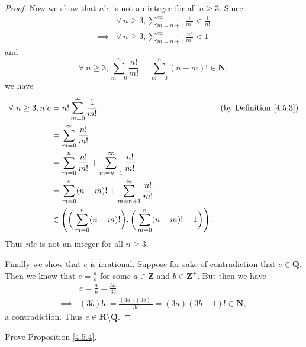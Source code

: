 \begin{proof}
    Now we show that \(n! e\) is not an integer for all \(n \geq 3\).
    Since
    \begin{align*}
                 & \forall\ n \geq 3, \sum_{m = n + 1}^\infty \frac{1}{m!} < \frac{1}{n!} \\
        \implies & \forall\ n \geq 3, \sum_{m = n + 1}^\infty \frac{n!}{m!} < 1
    \end{align*}
    and
    \[
        \forall\ n \geq 3, \sum_{m = 0}^n \frac{n!}{m!} = \sum_{m = 0}^n (n - m)! \in \mathbf{N},
    \]
    we have
    \begin{align*}
        \forall\ n \geq 3, n! e & = n! \sum_{m = 0}^\infty \frac{1}{m!}                                                         & \text{(by Definition \ref{4.5.3})} \\
                                & = \sum_{m = 0}^\infty \frac{n!}{m!}                                                                                                \\
                                & = \sum_{m = 0}^n \frac{n!}{m!} + \sum_{m = n + 1}^\infty \frac{n!}{m!}                                                             \\
                                & = \sum_{m = 0}^n (n - m)! + \sum_{m = n + 1}^\infty \frac{n!}{m!}                                                                  \\
                                & \in \Bigg(\bigg(\sum_{m = 0}^n (n - m)!\bigg), \bigg(\sum_{m = 0}^n (n - m)! + 1\bigg)\Bigg).
    \end{align*}
    Thus \(n! e\) is not an integer for all \(n \geq 3\).

    Finally we show that \(e\) is irrational.
    Suppose for sake of contradiction that \(e \in \mathbf{Q}\).
    Then we know that \(e = \frac{a}{b}\) for some \(a \in \mathbf{Z}\) and \(b \in \mathbf{Z}^+\).
    But then we have
    \begin{align*}
                 & e = \frac{a}{b} = \frac{3a}{3b}                                  \\
        \implies & (3b)! e = \frac{(3a) (3b)!}{3b} = (3a) (3b - 1)! \in \mathbf{N},
    \end{align*}
    a contradiction.
    Thus \(e \in \mathbf{R} \setminus \mathbf{Q}\).
\end{proof}

\begin{exercise}\label{ex 4.5.3}
    Prove Proposition \ref{4.5.4}.
\end{exercise}


